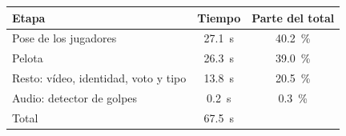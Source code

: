 \begin{tabular}{lcc}
\toprule
\textbf{Etapa} & \textbf{Tiempo} & \textbf{Parte del total} \\
\midrule
Pose de los jugadores & \SI{27.1}{\second} & \SI{40.2}{\percent} \\
Pelota & \SI{26.3}{\second} & \SI{39.0}{\percent} \\
Resto: vídeo, identidad, voto y tipo & \SI{13.8}{\second} & \SI{20.5}{\percent} \\
Audio: detector de golpes & \SI{0.2}{\second} & \SI{0.3}{\percent} \\
\midrule
Total & \SI{67.5}{\second} &  \\
\bottomrule
\end{tabular}
